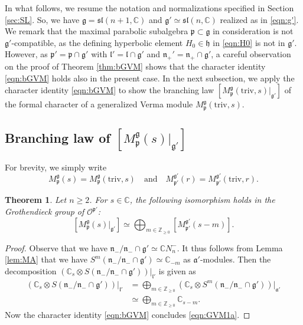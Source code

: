 \documentclass[reqno,11pt]{amsart}
\newtheorem{thm}[equation]{Theorem}
\theoremstyle{remark}
\theoremstyle{definition}
\numberwithin{equation}{section}
\newcommand{\fa}{{\mathfrak a}}
\newcommand{\fg}{{\mathfrak g}}
\newcommand{\fh}{{\mathfrak h}}
\newcommand{\fl}{{\mathfrak l}}
\newcommand{\fn}{{\mathfrak n}}
\newcommand{\fp}{{\mathfrak p}}
\newcommand{\f}{\mathfrak}
\newcommand{\C}{\mathbb{C}}
\newcommand{\Z}{\mathbb{Z}}
\newcommand{\Cal}{\mathcal}
\newcommand{\triv}{\mathrm{triv}}
\newcommand{\Mp}{M^{\fg}_{\fp}}
\newcommand{\Mpp}{M^{\fg'}_{\fp'}}
\begin{document}
\vskip 0.1in

In what follows, we resume the notation and normalizations 
specified in Section \ref{sec:SL}. So, we have 
$\fg= \f{sl}(n+1,\C)$ and $\fg' \simeq \f{sl}(n,\C)$ 
realized as in \eqref{eqn:g'}.
We remark that the maximal parabolic subalgebra
$\fp \subset \fg$ in consideration  is not $\fg'$-compatible, as 
the defining hyperbolic element $H_0\in \fh$ in \eqref{eqn:H0} is not in $\fg'$.
However, as $\fp'=\fp\cap \fg'$ with
$\fl' = \fl \cap \fg'$ and $\fn_+'=\fn_+\cap \fg'$,
a careful observation on the proof of Theorem \ref{thm:bGVM}
shows that the character identity \eqref{eqn:bGVM}  holds also in the present case.
In the next subsection, we apply the character identity \eqref{eqn:bGVM} to
show the branching law $[\Mp(\triv,s)\vert_{\fg'}]$ of  the formal character 
of a generalized Verma module $\Mp(\triv,s)$.

\subsection{Branching law of $[\Mp(s)\vert_{\fg'}]$}
\label{sec:GVMa}

For brevity,  we simply write 
\begin{equation*}
\Mp(s) = \Mp(\triv,s) \quad \text{and} \quad 
\Mpp(r)= \Mpp(\triv,r).
\end{equation*}

\begin{thm}\label{thm:GVM1}
Let $n\geq 2$. For $s \in \C$, 
the following isomorphism holds
in the Grothendieck group of $\Cal{O}^{\fp'}$:
\begin{equation}\label{eqn:GVM1a}
[\Mp(s)\vert_{\fg'}] \simeq 
\bigoplus_{m \in \Z_{\geq 0}}[\Mpp(s-m)].
\end{equation}
\end{thm}

\begin{proof}
Observe that we have $\fn_-/\fn_- \cap \fg' \simeq \C N_n^-$. 
It thus follows from Lemma \ref{lem:MA} that we have 
$S^m(\fn_-/\fn_-\cap \fg') \simeq \C_{-m}$ as $\fa'$-modules.
Then the decomposition 
$(\C_{s} \otimes S(\fn_-/\fn_-\cap \fg'))\vert_{\fl'}$ is given as
\begin{align*}
(\C_{s} \otimes S(\fn_-/\fn_-\cap \fg'))\vert_{\fl'}
&=
\bigoplus_{m\in \Z_{\geq 0}}
(\C_{s} \otimes S^m(\fn_-/\fn_-\cap \fg'))\vert_{\fa'}\\
&\simeq
\bigoplus_{m\in \Z_{\geq 0}}\C_{s-m}.
\end{align*}
Now the character identity \eqref{eqn:bGVM} concludes \eqref{eqn:GVM1a}.
\end{proof}
\end{document}
